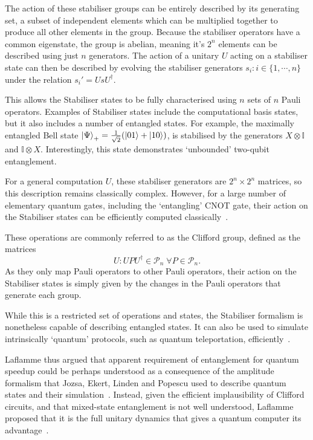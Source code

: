 \documentclass{standalone}
\begin{document}
\par
The action of these stabiliser groups can be entirely described by its generating set, a subset of independent elements which can be multiplied together to produce all other elements in the group. Because the stabiliser operators have a common eigenstate, the group is abelian, meaning it's $2^{n}$ elements can be described using just $n$ generators. The action of a unitary $U$ acting on a stabiliser state can then be described by evolving the stabiliser generators $s_{i}:i\in\{1,\cdots, n\}$ under the relation $s_{i}' = UsU^{\dagger}$. 
\par
This allows the Stabiliser states to be fully characterised using $n$ sets of $n$ Pauli operators. Examples of Stabiliser states include the computational basis states, but it also includes a number of entangled states. For example, the maximally entangled Bell state $\ket{\Psi}_{+}=\frac{1}{\sqrt{2}}(\ket{01}+\ket{10})$, is stabilised by the generators $X\otimes \mathbb{I}$ and $\mathbb{I}\otimes X$. Interestingly, this state demonstrates `unbounded' two-qubit entanglement.
\par
For a general computation $U$, these stabiliser generators are $2^{n}\times2^{n}$ matrices, so this description remains classically complex. However, for a large number of elementary quantum gates, including the `entangling' CNOT gate, their action on the Stabiliser states can be efficiently computed classically~\cite{Gottesman1999a}.
\par
These operations are commonly referred to as the Clifford group, defined as the matrices~\cite{Gottesman1999a}
\begin{equation}\label{eq:Clifford}
U:UPU^{\dagger}\in\mathcal{P}_{n}\;\forall P\in\mathcal{P}_{n}.
\end{equation}
As they only map Pauli operators to other Pauli operators, their action on the Stabiliser states is simply given by the changes in the Pauli operators that generate each group. 
\par
While this is a restricted set of operations and states, the Stabiliser formalism is nonetheless capable of describing entangled states. It can also be used to simulate intrinsically `quantum' protocols, such as quantum teleportation, efficiently~\cite{Aaronson2004a}.
\par
Laflamme thus argued that apparent requirement of entanglement for quantum speedup could be perhaps understood as a consequence of the amplitude formalism that Jozsa, Ekert, Linden and Popescu used to describe quantum states and their simulation~\cite{Laflamme2001}. Instead, given the efficient implausibility of Clifford circuits, and that mixed-state entanglement is not well understood, Laflamme proposed that it is the full unitary dynamics that gives a quantum computer its advantage~\cite{Laflamme2001}.
\end{document}

